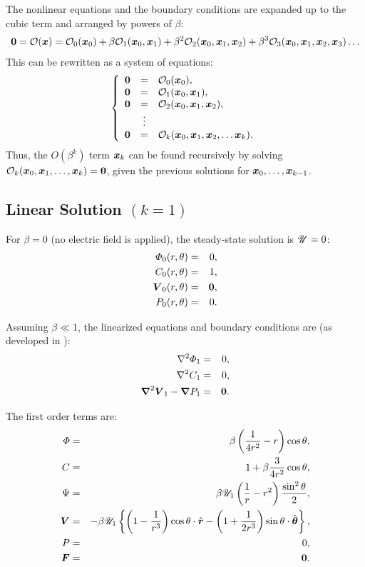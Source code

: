 The nonlinear equations and the boundary conditions are expanded up to the cubic term
and arranged by powers of $\beta$:
\begin{eqnarray}
\bzero = \cO(\bx) = \cO_0(\bx_0) 
   + \beta \cO_1(\bx_0, \bx_1) 
 + \beta^2 \cO_2(\bx_0, \bx_1, \bx_2) 
 + \beta^3 \cO_3(\bx_0, \bx_1, \bx_2, \bx_3) \ldots
\end{eqnarray}
This can be rewritten as a system of equations:
\begin{eqnarray}
\brc{rcl}{
\bzero &=& \cO_0(\bx_0), \\
\bzero &=& \cO_1(\bx_0, \bx_1), \\
\bzero &=& \cO_2(\bx_0, \bx_1, \bx_2), \\
& \vdots & \\
\bzero &=& \cO_k(\bx_0, \bx_1, \bx_2, \ldots \bx_k).
}
\end{eqnarray}
Thus, the $O(\beta^k)$ term $\bx_k$ can be found recursively by solving 
$\cO_k(\bx_0, \bx_1, \ldots, \bx_k) = \bzero$,
given the previous solutions for $\bx_0, \ldots, \bx_{k-1}$.

\subsection{Linear Solution $(k=1)$}

For $\beta = 0$ (no electric field is applied), the steady-state solution is $\cU = 0$:
\begin{eqnarray}
\varPhi_0(r,\theta) &=& 0, \\
C_0(r,\theta) &=& 1, \\
\bV_0(r,\theta) &=& \bzero, \\
P_0(r,\theta) &=& 0.
\end{eqnarray}

Assuming $\beta \ll 1$, the linearized equations and boundary conditions are 
(as developed in \cite{yariv2010migration}):
\begin{eqnarray}
\Laplacian \varPhi_1 &=& 0, \\
\Laplacian C_1 &=& 0, \\
\bLaplacian \bV_1 - \bnabla P_1 &=& \bzero.
\end{eqnarray}

The first order terms are:
\begin{eqnarray}
\varPhi &=& \beta \pars{\frac{1}{4r^2} - r}\cos\theta, \\
C &=& 1 + \beta \frac{3}{4r^2} \cos\theta, \\
\Psi &=& \beta \cU_1 \pars{\frac{1}{r} - r^2} \frac{\sin^2\theta}{2}, \\
\bV &=& -\beta \cU_1 \brcs{\pars{1 - \frac{1}{r^3}}\cos\theta \cdot \brhat - 
                               \pars{1 + \frac{1}{2r^3}} \sin\theta \cdot \bthetahat}, \\
P &=& 0, \\
\bF &=& \bzero.
\end{eqnarray}

